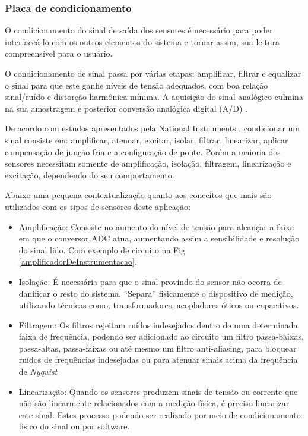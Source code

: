 \subsubsection{Placa de condicionamento}

O condicionamento do sinal de saída dos sensores é necessário para poder interfaceá-lo com os outros elementos do sistema e tornar assim, sua leitura compreensível para o usuário.

O condicionamento de sinal passa por várias etapas: amplificar, filtrar e equalizar o sinal para que este ganhe níveis de tensão adequados, com boa relação sinal/ruído e distorção harmônica mínima. A aquisição do sinal analógico culmina na sua amostragem e posterior conversão analógica digital (A/D) \cite{SMAR}.

De acordo com estudos apresentados pela National Instruments \cite{national01}, condicionar um sinal consiste em: amplificar, atenuar, excitar, isolar, filtrar, linearizar, aplicar compensação de junção fria e a configuração de ponte. Porém a maioria dos sensores necessitam somente de amplificação, isolação, filtragem, linearização e excitação, dependendo do seu comportamento.

Abaixo uma pequena contextualização quanto aos conceitos que mais são utilizados com os tipos de sensores deste aplicação:

\begin{itemize}
	\item Amplificação: Consiste no aumento do nível de tensão para alcançar a faixa em que o conversor ADC atua, aumentando assim a sensibilidade e resolução do sinal lido. Com exemplo de circuito na Fig \ref{amplificadorDeInstrumentacao}.
	\item Isolação: É necessária para que o sinal provindo do sensor não ocorra de danificar o resto do sistema. “Separa” fisicamente o dispositivo de medição, utilizando técnicas como, transformadores, acopladores óticos ou capacitivos.
	\item Filtragem: Os filtros rejeitam ruídos indesejados dentro de uma determinada faixa de frequência, podendo ser adicionado ao circuito um filtro passa-baixas, passa-altas, passa-faixas ou até mesmo um filtro anti-aliasing, para bloquear ruídos de frequências indesejadas ou para atenuar sinais acima da frequência de \textit{Nyquist}
	\item Linearização: Quando os sensores produzem sinais de tensão ou corrente que não são linearmente relacionados com a medição física, é preciso linearizar este sinal. Estes processo podendo ser realizado por meio de condicionamento físico do sinal ou por software.
\end{itemize}

